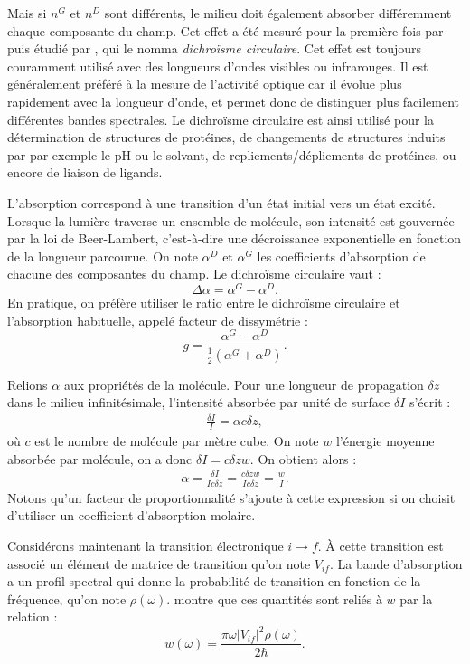 Mais si $n^{G}$ et $n^{D}$ sont différents, le milieu doit également absorber différemment chaque composante du champ. Cet effet a été mesuré pour la première fois par  puis étudié par , qui le nomma \textit{dichroïsme circulaire}. Cet effet est toujours couramment utilisé avec des longueurs d'ondes visibles ou infrarouges. Il est généralement préféré à la mesure de l'activité optique car il évolue plus rapidement avec la longueur d'onde, et permet donc de distinguer plus facilement différentes bandes spectrales. Le dichroïsme circulaire est ainsi utilisé pour la détermination de structures de protéines, de changements de structures induits par par exemple le pH ou le solvant, de repliements/dépliements de protéines, ou encore de liaison de ligands.

L'absorption correspond à une transition d'un état initial vers un état excité. Lorsque la lumière traverse un ensemble de molécule, son intensité est gouvernée par la loi de Beer-Lambert, c'est-à-dire une décroissance exponentielle en fonction de la longueur parcourue. On note $\alpha^{D}$ et $\alpha^{G}$ les coefficients d'absorption de chacune des composantes du champ. Le dichroïsme circulaire vaut :
\[\Delta \alpha = \alpha^{G}-\alpha^{D}.\]
En pratique, on préfère utiliser le ratio entre le dichroïsme circulaire et l'absorption habituelle, appelé facteur de dissymétrie  : 
\begin{equation}
g = \frac{\alpha^{G}-\alpha^{D}}{\frac{1}{2}(\alpha^{G}+\alpha^{D})}.
\label{eq:kuhn}
\end{equation}

Relions $\alpha$ aux propriétés de la molécule. Pour une longueur de propagation $\delta z$ dans le milieu infinitésimale, l'intensité absorbée par unité de surface $\delta I$ s'écrit :
\begin{align*}
\frac{\delta I}{I} = \alpha c \delta z,
\end{align*}
où $c$ est le nombre de molécule par mètre cube. On note $w$ l'énergie moyenne absorbée par molécule, on a donc $\delta I = c \delta z w$. On obtient alors :
\begin{align}
\alpha = \frac{\delta I}{Ic \delta z} = \frac{c \delta z w}{Ic \delta z} = \frac{w}{I}.
\label{eq:cd1}
\end{align}
Notons qu'un facteur de proportionnalité s'ajoute à cette expression si on choisit d'utiliser un coefficient d'absorption molaire.

Considérons maintenant la transition électronique $i\rightarrow f$. \`A cette transition est associé un élément de matrice de transition qu'on note $V_{if}$. La bande d'absorption a un profil spectral qui donne la probabilité de transition en fonction de la fréquence, qu'on note $\rho(\omega)$.  montre que ces quantités sont reliés à $w$ par la relation :
\begin{equation}
w(\omega) = \frac{\pi \omega |V_{if}|^2 \rho(\omega)}{2\hbar}.
\label{eq:cd2}
\end{equation}

